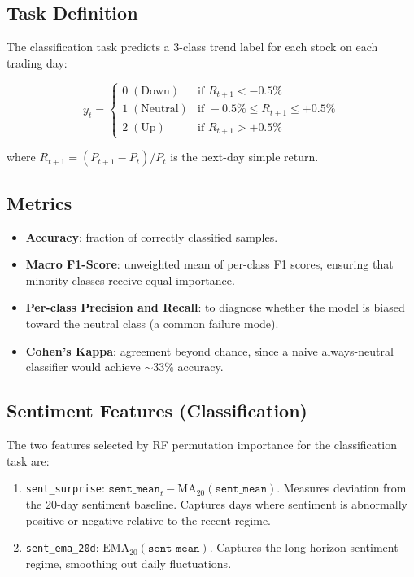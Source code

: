\subsection{Task Definition}

The classification task predicts a 3-class trend label for each stock on each
trading day:

\begin{equation}
  y_t =
  \begin{cases}
    0 \;(\text{Down})    & \text{if } R_{t+1} < -0.5\% \\
    1 \;(\text{Neutral}) & \text{if } -0.5\% \leq R_{t+1} \leq +0.5\% \\
    2 \;(\text{Up})      & \text{if } R_{t+1} > +0.5\%
  \end{cases}
  \label{eq:trend-label}
\end{equation}

where $R_{t+1} = (P_{t+1} - P_t) / P_t$ is the next-day simple return.

\subsection{Metrics}

\begin{itemize}
  \item \textbf{Accuracy}: fraction of correctly classified samples.
  \item \textbf{Macro F1-Score}: unweighted mean of per-class F1 scores,
        ensuring that minority classes receive equal importance.
  \item \textbf{Per-class Precision and Recall}: to diagnose whether the model
        is biased toward the neutral class (a common failure mode).
  \item \textbf{Cohen's Kappa}: agreement beyond chance, since a naive
        always-neutral classifier would achieve ${\sim}33\%$ accuracy.
\end{itemize}

\subsection{Sentiment Features (Classification)}

The two features selected by RF permutation importance for the classification
task are:

\begin{enumerate}
  \item \texttt{sent\_surprise}: $\texttt{sent\_mean}_t - \text{MA}_{20}(\texttt{sent\_mean})$.
        Measures deviation from the 20-day sentiment baseline.  Captures days
        where sentiment is abnormally positive or negative relative to the
        recent regime.

  \item \texttt{sent\_ema\_20d}: $\text{EMA}_{20}(\texttt{sent\_mean})$.
        Captures the long-horizon sentiment regime, smoothing out daily
        fluctuations.
\end{enumerate}

